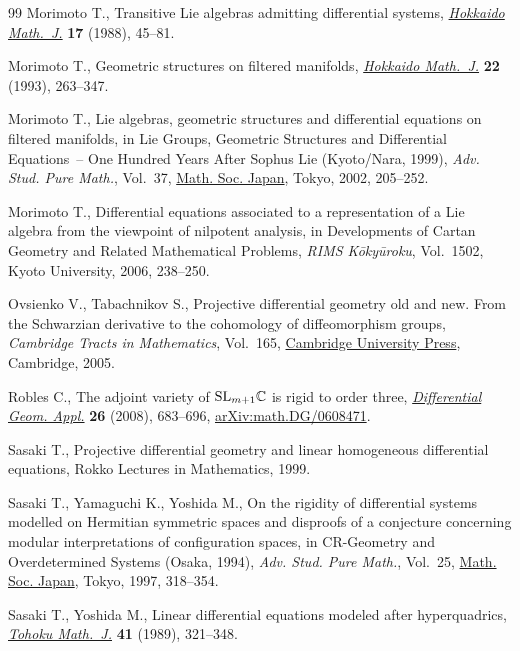 \documentclass[pdftex]{sigma}%
\numberwithin{equation}{section}
\begin{document}
\begin{thebibliography}{99}
Morimoto T., Transitive {L}ie algebras admitting differential systems,
 \href{https://doi.org/10.14492/hokmj/1381517794}{\textit{Hokkaido Math.~J.}} \textbf{17} (1988), 45--81.

Morimoto T., Geometric structures on filtered manifolds, \href{https://doi.org/10.14492/hokmj/1381413178}{\textit{Hokkaido
 Math.~J.}} \textbf{22} (1993), 263--347.

Morimoto T., Lie algebras, geometric structures and differential equations on
 filtered manifolds, in Lie Groups, Geometric Structures and Differential
 Equations~-- One Hundred Years After {S}ophus {L}ie ({K}yoto/{N}ara, 1999),
 \textit{Adv. Stud. Pure Math.}, Vol.~37, \href{https://doi.org/10.2969/aspm/03710205}{Math. Soc. Japan}, Tokyo, 2002,
 205--252.

Morimoto T., Differential equations associated to a representation of a {L}ie
 algebra from the viewpoint of nilpotent analysis, in Developments of Cartan
 Geometry and Related Mathematical Problems, \textit{RIMS K\=oky\=uroku}, Vol.~1502, Kyoto University, 2006, 238--250.

Ovsienko V., Tabachnikov S., Projective differential geometry old and new. From
 the Schwarzian derivative to the cohomology of diffeomorphism groups,
 \textit{Cambridge Tracts in Mathematics}, Vol.~165, \href{https://doi.org/10.1017/CBO9780511543142}{Cambridge University
 Press}, Cambridge, 2005.

Robles C., The adjoint variety of {${\rm SL}_{m+1}\mathbb C$} is rigid to order
 three, \href{https://doi.org/10.1016/j.difgeo.2008.04.017}{\textit{Differential Geom. Appl.}} \textbf{26} (2008), 683--696,
 \href{https://arxiv.org/abs/math.DG/0608471}{arXiv:math.DG/0608471}.

Sasaki T., Projective differential geometry and linear homogeneous differential
 equations, {R}okko Lectures in Mathematics, 1999.

Sasaki T., Yamaguchi K., Yoshida M., On the rigidity of differential systems
 modelled on {H}ermitian symmetric spaces and disproofs of a conjecture
 concerning modular interpretations of configuration spaces, in C{R}-Geometry
 and Overdetermined Systems ({O}saka, 1994), \textit{Adv. Stud. Pure Math.},
 Vol.~25, \href{https://doi.org/10.2969/aspm/02510318}{Math. Soc. Japan}, Tokyo, 1997, 318--354.

Sasaki T., Yoshida M., Linear differential equations modeled after
 hyperquadrics, \href{https://doi.org/10.2748/tmj/1178227829}{\textit{Tohoku Math.~J.}} \textbf{41} (1989), 321--348.


\end{thebibliography}
\end{document}
